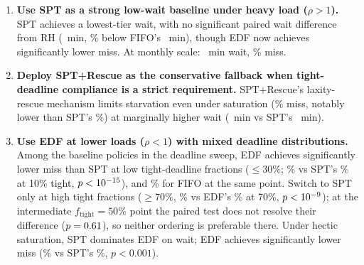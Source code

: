 {\begin{enumerate}
  \item \textbf{Use SPT as a strong low-wait baseline under heavy load ($\rho>1$).} SPT achieves a lowest-tier wait, with no significant paired wait difference from RH (\SPTwait~min, \SPTFIFOwaitDiffPct\% below FIFO's \FIFOwait~min), though EDF now achieves significantly lower miss. At monthly scale: \PhFourSPTwait~min wait, \PhFourSPTmiss\% miss.
  \item \textbf{Deploy SPT+Rescue as the conservative fallback when tight-deadline compliance is a strict requirement.} SPT+Rescue's laxity-rescue mechanism limits starvation even under saturation (\RescueMiss\% miss, notably lower than SPT's \SPTmiss\%) at marginally higher wait (\RescueWait~min vs SPT's \SPTwait~min).
  \item \textbf{Use EDF at lower loads ($\rho<1$) with mixed deadline distributions.} Among the baseline policies in the deadline sweep, EDF achieves significantly lower miss than SPT at low tight-deadline fractions ($\leq 30\%$; \DlTenEDFmiss\% vs SPT's \DlTenSPTmiss\% at 10\% tight, $p<10^{-15}$), and \DlTenFIFOmiss\% for FIFO at the same point. Switch to SPT only at high tight fractions ($\geq 70\%$, \DlSeventySPTmiss\% vs EDF's \DlSeventyEDFmiss\% at 70\%, $p<10^{-9}$); at the intermediate $f_{\text{tight}}=50\%$ point the paired test does not resolve their difference ($p=0.61$), so neither ordering is preferable there. Under hectic saturation, SPT dominates EDF on wait; EDF achieves significantly lower miss (\EDFmiss\% vs SPT's \SPTmiss\%, $p<0.001$).

\end{enumerate}}
